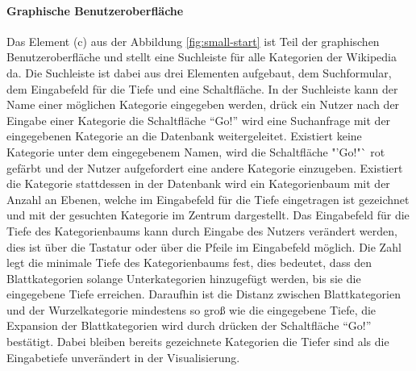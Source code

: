 \paragraph{Graphische Benutzeroberfläche}
Das Element (c) aus der Abbildung \ref{fig:small-start} ist Teil der graphischen Benutzeroberfläche und stellt eine Suchleiste für alle Kategorien der Wikipedia da.
Die Suchleiste ist dabei aus drei Elementen aufgebaut, dem Suchformular, dem Eingabefeld für die Tiefe und eine Schaltfläche.
In der Suchleiste kann der Name einer möglichen Kategorie eingegeben werden, drück ein Nutzer nach der Eingabe einer Kategorie die Schaltfläche "`Go!"' wird eine Suchanfrage mit der eingegebenen Kategorie an die Datenbank weitergeleitet.
Existiert keine Kategorie unter dem eingegebenem Namen, wird die Schaltfläche "'Go!"` rot gefärbt und der Nutzer aufgefordert eine andere Kategorie einzugeben.
Existiert die Kategorie stattdessen in der Datenbank wird ein Kategorienbaum mit der Anzahl an Ebenen, welche im Eingabefeld für die Tiefe eingetragen ist gezeichnet und mit der gesuchten Kategorie im Zentrum dargestellt.
Das Eingabefeld für die Tiefe des Kategorienbaums kann durch Eingabe des Nutzers verändert werden, dies ist über die Tastatur oder über die Pfeile im Eingabefeld möglich.
Die Zahl legt die minimale Tiefe des Kategorienbaums fest, dies bedeutet, dass den Blattkategorien solange Unterkategorien hinzugefügt werden, bis sie die eingegebene Tiefe erreichen.
Daraufhin ist die Distanz zwischen  Blattkategorien und der Wurzelkategorie mindestens so groß wie die eingegebene Tiefe, die Expansion der Blattkategorien wird durch drücken der Schaltfläche "`Go!"' bestätigt.
Dabei bleiben bereits gezeichnete Kategorien die Tiefer sind als die Eingabetiefe unverändert in der Visualisierung.

